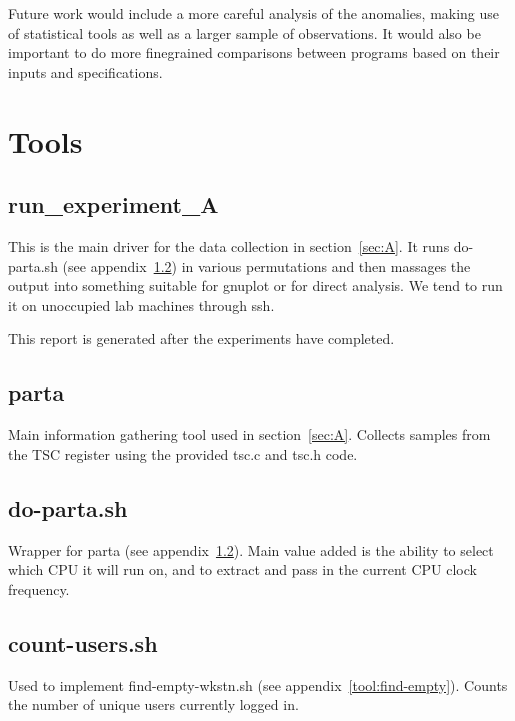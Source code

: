\documentclass{article}
\begin{document}
\begin{framed}
    \label{lst:inactive}
    
\end{framed}


Future work would include a more careful analysis of the anomalies, making use of statistical tools as well as a larger sample of observations. It would also be important to do more finegrained comparisons between programs based on their inputs and specifications.

\newpage
\appendix
\section{Tools}

\subsection{run\_experiment\_A} \label{tool:run}
This is the main driver for the data collection in section~\ref{sec:A}.
It runs do-parta.sh (see appendix~\ref{tool:parta}) in various permutations
and then massages the output into something suitable for gnuplot or for direct
analysis. We tend to run it on unoccupied lab machines through ssh.

This report is generated after the experiments have completed.


\subsection{parta} \label{tool:parta}
Main information gathering tool used in section~\ref{sec:A}. Collects samples
from the TSC register using the provided tsc.c and tsc.h code.
\begin{framed}
    \label{lst:parta}
    
\end{framed}

\subsection{do-parta.sh} \label{tool:do-parta}
Wrapper for parta (see appendix~\ref{tool:parta}). Main value added is the
ability to select which CPU it will run on, and to extract and pass in the
current CPU clock frequency.
\begin{framed}
    \label{lst:do-parta}
    
\end{framed}

\subsection{count-users.sh} \label{tool:count-users.sh}
Used to implement find-empty-wkstn.sh (see appendix~\ref{tool:find-empty}).
Counts the number of unique users currently logged in.
\end{document}
